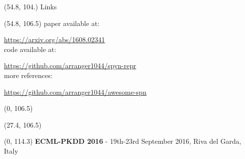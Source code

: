 \documentclass[final]{beamer}
\begin{document}
\begin{frame}{}
  \begin{textblock}{80}(54.8, 104.)
    Links
  \end{textblock}

  \begin{textblock}{52}(54.8, 106.5)
    \small
    paper available at:\par
    \hspace{35pt}\url{https://arxiv.org/abs/1608.02341}\\
    code available at:\par
    \hspace{35pt}\url{https://github.com/arranger1044/spyn-repr}\\
    more references:\par
    \hspace{35pt}\url{https://github.com/arranger1044/awesome-spn}
  \end{textblock}
  
 \begin{textblock}{52}(0, 106.5)
    \small
    \setlength\bibitemsep{8pt}
    \printbibliography[heading=none]
  \end{textblock}
  
  \begin{textblock}{25.2}(27.4, 106.5)
    \small
  \end{textblock}
  

  \begin{textblock}{80}(0, 114.3)
    \footnotesize
    \flushright
    \textbf{ECML-PKDD 2016}  -  19th-23rd September 2016, Riva del Garda, Italy\hfill
  \end{textblock}
  
\end{frame}
\end{document}
